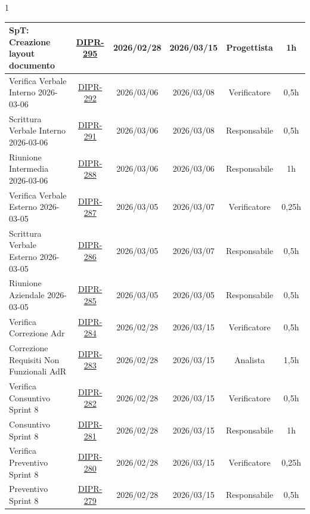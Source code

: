 \documentclass[a4paper,12pt]{article}
\begin{document}
\begin{spacing}{1}
\begin{longtable}{|p{4cm}|c|c|c|c|c|}
        \hline
        SpT: Creazione layout documento & \href{https://7zpus.atlassian.net/browse/DIPR-295}{DIPR-295} & 2026/02/28 & 2026/03/15 & Progettista & 1h \\
        \hline
        Verifica Verbale Interno 2026-03-06 & \href{https://7zpus.atlassian.net/browse/DIPR-292}{DIPR-292} & 2026/03/06 & 2026/03/08 & Verificatore & 0,5h \\
        \hline
        Scrittura Verbale Interno 2026-03-06 & \href{https://7zpus.atlassian.net/browse/DIPR-291}{DIPR-291} & 2026/03/06 & 2026/03/08 & Responsabile & 0,5h \\
        \hline
        Riunione Intermedia 2026-03-06 & \href{https://7zpus.atlassian.net/browse/DIPR-288}{DIPR-288} & 2026/03/06 & 2026/03/06 & Responsabile & 1h \\
        \hline
        Verifica Verbale Esterno 2026-03-05 & \href{https://7zpus.atlassian.net/browse/DIPR-287}{DIPR-287} & 2026/03/05 & 2026/03/07 & Verificatore & 0,25h \\
        \hline
        Scrittura Verbale Esterno 2026-03-05 & \href{https://7zpus.atlassian.net/browse/DIPR-286}{DIPR-286} & 2026/03/05 & 2026/03/07 & Responsabile & 0,5h \\
        \hline
        Riunione Aziendale 2026-03-05 & \href{https://7zpus.atlassian.net/browse/DIPR-285}{DIPR-285} & 2026/03/05 & 2026/03/05 & Responsabile & 0,5h \\
        \hline
        Verifica Correzione Adr & \href{https://7zpus.atlassian.net/browse/DIPR-284}{DIPR-284} & 2026/02/28 & 2026/03/15 & Verificatore & 0,5h \\
        \hline
        Correzione Requisiti Non Funzionali AdR & \href{https://7zpus.atlassian.net/browse/DIPR-283}{DIPR-283} & 2026/02/28 & 2026/03/15 & Analista & 1,5h \\
        \hline
        Verifica Consuntivo Sprint 8 & \href{https://7zpus.atlassian.net/browse/DIPR-282}{DIPR-282} & 2026/02/28 & 2026/03/15 & Verificatore & 0,5h \\
        \hline
        Consuntivo Sprint 8 & \href{https://7zpus.atlassian.net/browse/DIPR-281}{DIPR-281} & 2026/02/28 & 2026/03/15 & Responsabile & 1h \\
        \hline
        Verifica Preventivo Sprint 8 & \href{https://7zpus.atlassian.net/browse/DIPR-280}{DIPR-280} & 2026/02/28 & 2026/03/15 & Verificatore & 0,25h \\
        \hline
        Preventivo Sprint 8 & \href{https://7zpus.atlassian.net/browse/DIPR-279}{DIPR-279} & 2026/02/28 & 2026/03/15 & Responsabile & 0,5h \\

\end{longtable}
\end{spacing}
\end{document}
